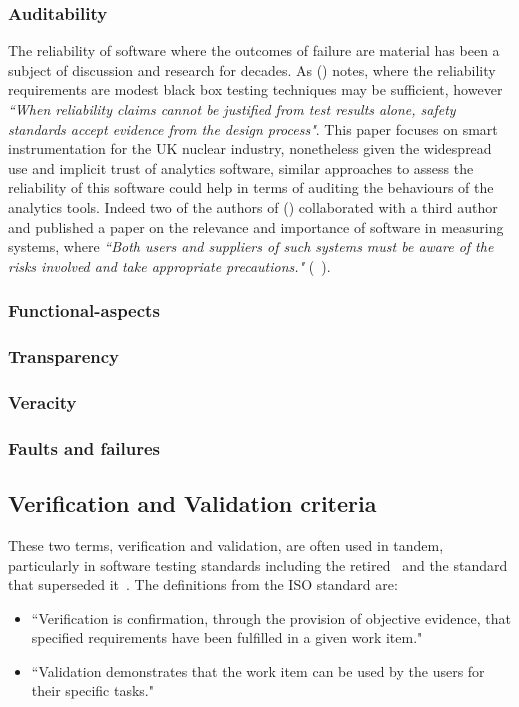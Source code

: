 \subsubsection{Auditability}
The reliability of software where the outcomes of failure are material has been a subject of discussion and research for decades. As (\cite{dobbing1998reliability}) notes, where the reliability requirements are modest black box testing techniques may be sufficient, however \emph{``When reliability claims cannot be justified from test results alone, safety standards accept evidence from the design process"}. This paper focuses on smart instrumentation for the UK nuclear industry, nonetheless given the widespread use and implicit trust of analytics software, similar approaches to assess the reliability of this software could help in terms of auditing the behaviours of the analytics tools. Indeed two of the authors of (\cite{dobbing1998reliability}) collaborated with a third author and published a paper on the relevance and importance of software in measuring systems, where \emph{``Both users and suppliers of such systems must be aware of the risks involved and take appropriate precautions."} (~\cite{wichmann2007software}).

\subsubsection{Functional-aspects}

\subsubsection{Transparency}

\subsubsection{Veracity}

\subsubsection{Faults and failures}


\subsection{Verification and Validation criteria}
These two terms, verification and validation, are often used in tandem, particularly in software testing standards including the retired~\cite{BS_7925_1_1998} and the standard that superseded it~\cite{iso29119-1-2013}. The definitions from the ISO standard are:
\begin{itemize}
    \item ``Verification is confirmation, through the provision of objective evidence, that specified requirements have been fulfilled in a given work item."~\cite{iso29119-1-2013}
    \item ``Validation demonstrates that the work item can be used by the users for their specific tasks."~\cite{iso29119-1-2013}
\end{itemize}


